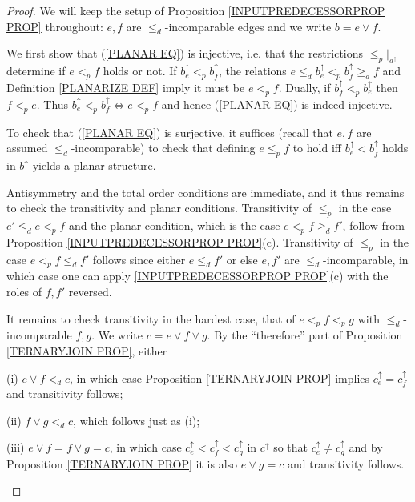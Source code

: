 \documentclass[a4paper,10pt]{article}%
\begin{document}
\begin{proof}
We will keep the setup of Proposition \ref{INPUTPREDECESSORPROP PROP} throughout: $e, f$ are $\leq_d$-incomparable edges and we write $b = e \vee f$. 

	We first show that (\ref{PLANAR EQ}) is injective, i.e. that the restrictions $\leq_p|_{a^{\uparrow}}$ determine if 
	$e <_p f$ holds or not.
If $b^{\uparrow}_e <_p b^{\uparrow}_f$, the relations
$e \leq_d b^{\uparrow}_e <_p b^{\uparrow}_f \geq_d f$
and Definition \ref{PLANARIZE DEF} imply it must be $e <_p f$.
Dually, if $b^{\uparrow}_f <_p b^{\uparrow}_e$ then 
$f <_p e$. Thus 
$b^{\uparrow}_e <_p b^{\uparrow}_f \Leftrightarrow e <_p f$ and hence (\ref{PLANAR EQ}) is indeed injective.

To check that (\ref{PLANAR EQ}) is surjective, it suffices (recall that $e,f$ are assumed $\leq_d$-incomparable) to check that
defining $e \leq_p f$ to hold iff $b^{\uparrow}_e < b^{\uparrow}_f$ holds in $b^{\uparrow}$ yields a planar structure.

Antisymmetry and the total order conditions are immediate, and it thus remains to check the transitivity and planar conditions.
Transitivity of $\leq_p$ in the case $e' \leq_d e <_p f$ and the planar condition, which is the case $e <_p f \geq_d f'$, follow from Proposition \ref{INPUTPREDECESSORPROP PROP}(c). Transitivity of $\leq_p$ in the case $e <_p f \leq_d f'$
follows since either $e \leq_d f'$ or else $e,f'$ are $\leq_d$-incomparable, in which case one can apply \ref{INPUTPREDECESSORPROP PROP}(c) with the roles of $f,f'$ reversed.

It remains to check transitivity in the hardest case, that of 
$e <_p f <_p g$ with $\leq_d$-incomparable $f,g$.
We write $c = e \vee f \vee g$.
By the ``therefore'' part of Proposition \ref{TERNARYJOIN PROP}, either
\begin{inparaenum}
	\item[(i)] $e \vee f <_d c$, in which case 
	Proposition \ref{TERNARYJOIN PROP}
	implies 
	$c^{\uparrow}_e = c^{\uparrow}_f$ and transitivity follows;
	\item[(ii)] $f \vee g <_d c$, which follows just as (i);
	\item[(iii)]  
$e \vee f = f \vee g =c$, in which case 
$c^{\uparrow}_e <
c^{\uparrow}_f <
c^{\uparrow}_g $ in $c^{\uparrow}$
so that $c^{\uparrow}_e \neq c^{\uparrow}_g$ and by Proposition \ref{TERNARYJOIN PROP} it is also 
$e \vee g = c$ and transitivity follows.
\end{inparaenum}
\end{proof}
\end{document}
